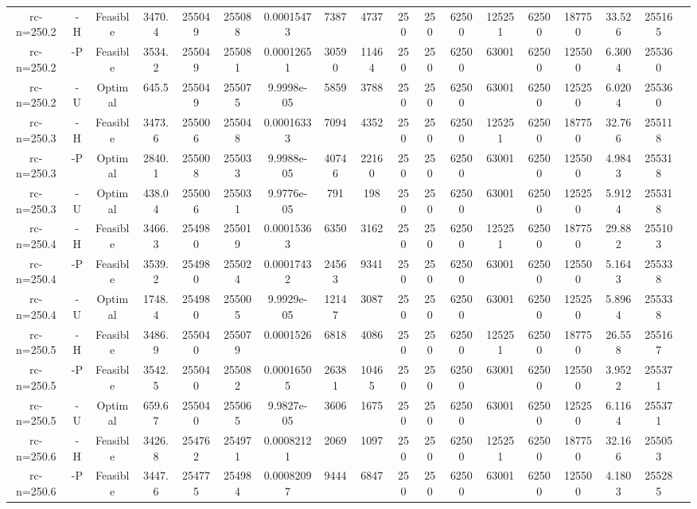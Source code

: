 \documentclass[landscape, a4paper]{article}
\begin{document}
\begin{center}
\begin{tabular}{@{}cccccccccccccccccc@{}}
rc-n=250.2 & -H & Feasible & 3470.4 & 255049 & 255088 & 0.00015473 & 7387 & 4737 & 250 & 250 & 62500 & 125251 & 62500 & 187750 & 33.526 & 255165 & \\
rc-n=250.2 & -P & Feasible & 3534.2 & 255049 & 255081 & 0.00012651 & 30590 & 11464 & 250 & 250 & 62500 & 63001 & 62500 & 125500 & 6.3004 & 255360 & \\
rc-n=250.2 & -U & Optimal & 645.5 & 255049 & 255075 & 9.9998e-05 & 5859 & 3788 & 250 & 250 & 62500 & 63001 & 62500 & 125250 & 6.0204 & 255360 & \\
rc-n=250.3 & -H & Feasible & 3473.6 & 255006 & 255048 & 0.00016333 & 7094 & 4352 & 250 & 250 & 62500 & 125251 & 62500 & 187750 & 32.766 & 255118 & \\
rc-n=250.3 & -P & Optimal & 2840.1 & 255008 & 255033 & 9.9988e-05 & 40746 & 22160 & 250 & 250 & 62500 & 63001 & 62500 & 125500 & 4.9843 & 255318 & \\
rc-n=250.3 & -U & Optimal & 438.04 & 255006 & 255031 & 9.9776e-05 & 791 & 198 & 250 & 250 & 62500 & 63001 & 62500 & 125250 & 5.9124 & 255318 & \\
rc-n=250.4 & -H & Feasible & 3466.3 & 254980 & 255019 & 0.00015363 & 6350 & 3162 & 250 & 250 & 62500 & 125251 & 62500 & 187750 & 29.882 & 255103 & \\
rc-n=250.4 & -P & Feasible & 3539.2 & 254980 & 255024 & 0.00017432 & 24563 & 9341 & 250 & 250 & 62500 & 63001 & 62500 & 125500 & 5.1643 & 255338 & \\
rc-n=250.4 & -U & Optimal & 1748.4 & 254980 & 255005 & 9.9929e-05 & 12147 & 3087 & 250 & 250 & 62500 & 63001 & 62500 & 125250 & 5.8964 & 255338 & \\
rc-n=250.5 & -H & Feasible & 3486.9 & 255040 & 255079 & 0.0001526 & 6818 & 4086 & 250 & 250 & 62500 & 125251 & 62500 & 187750 & 26.558 & 255167 & \\
rc-n=250.5 & -P & Feasible & 3542.5 & 255040 & 255082 & 0.00016505 & 26381 & 10465 & 250 & 250 & 62500 & 63001 & 62500 & 125500 & 3.9522 & 255371 & \\
rc-n=250.5 & -U & Optimal & 659.67 & 255040 & 255065 & 9.9827e-05 & 3606 & 1675 & 250 & 250 & 62500 & 63001 & 62500 & 125250 & 6.1164 & 255371 & \\
rc-n=250.6 & -H & Feasible & 3426.8 & 254762 & 254971 & 0.00082121 & 2069 & 1097 & 250 & 250 & 62500 & 125251 & 62500 & 187750 & 32.166 & 255053 & \\
rc-n=250.6 & -P & Feasible & 3447.6 & 254775 & 254984 & 0.00082097 & 9444 & 6847 & 250 & 250 & 62500 & 63001 & 62500 & 125500 & 4.1803 & 255285 & \\

\end{tabular}
\end{center}
\end{document}
